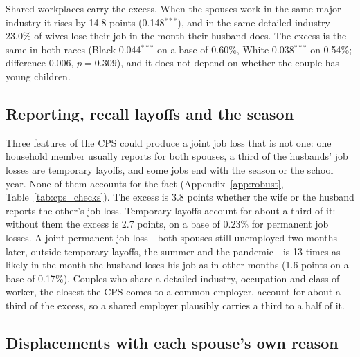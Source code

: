Shared workplaces carry the excess. When the spouses work in the same major industry it rises by 14.8 points
(0.148$^{***}$), and in the same detailed industry 23.0\% of wives lose their job in the month their husband does. The
excess is the same in both races (Black 0.044$^{***}$ on a base of 0.60\%, White 0.038$^{***}$ on 0.54\%; difference
0.006, $p=0.309$), and it does not depend on whether the couple has young children.

\subsection{Reporting, recall layoffs and the season}

Three features of the CPS could produce a joint job loss that is not one: one household member usually reports for
both spouses, a third of the husbands' job losses are temporary layoffs, and some jobs end with the season or the
school year. None of them accounts for the fact (Appendix~\ref{app:robust}, Table~\ref{tab:cps_checks}). The excess is
3.8 points whether the wife or the husband reports the other's job loss. Temporary layoffs account for about a third of
it: without them the excess is 2.7 points, on a base of 0.23\% for permanent job losses. A joint permanent job
loss---both spouses still unemployed two months later, outside temporary layoffs, the summer and the pandemic---is 13
times as likely in the month the husband loses his job as in other months (1.6 points on a base of 0.17\%). Couples who
share a detailed industry, occupation and class of worker, the closest the CPS comes to a common employer, account for
about a third of the excess, so a shared employer plausibly carries a third to a half of it.

\subsection{Displacements with each spouse's own reason}

